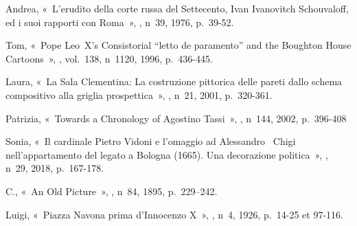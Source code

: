 \begin{teiElement}[name={TEI},change={commons\_edition}]
\begin{teiElement}[name={text},type={book},xmlid={book}]
\begin{teiElement}[name={group},type={book},xmlid={book-001}]
\begin{teiElement}[name={group},type={bibliography},data-page-title={Sources et bibliographie},data-include-href={Ch14\_Source\_bibliographie.xml},xmlid={bibliography-001}]
\begin{teiElement}[name={body}]
\begin{teiDiv}[type={section1},xmlid={div18}]
\begin{teiDiv}[type={section2},xmlid={div20}]
\begin{teiBibl}[xmlid={bibl-434}]
\end{teiBibl}
              \begin{teiBibl}[xmlid={bibl-435}]
 Andrea, « L’erudito della corte russa del Settecento, Ivan Ivanovitch Schouvaloff, ed i suoi rapporti con Roma », , n 39, 1976, p. 39-52.
\end{teiBibl}
              \begin{teiBibl}[xmlid={bibl-436}]
 Tom, « Pope Leo X’s Consistorial “letto de paramento” and the Boughton House Cartoons », , vol. 138, n 1120, 1996, p. 436-445.
\end{teiBibl}
              \begin{teiBibl}[xmlid={bibl-437}]
 Laura, « La Sala Clementina: La costruzione pittorica delle pareti dallo schema compositivo alla griglia prospettica », , n 21, 2001, p. 320-361.
\end{teiBibl}
              \begin{teiBibl}[xmlid={bibl-438}]
 Patrizia, « Towards a Chronology of Agostino Tassi », , n 144, 2002, p. 396-408
\end{teiBibl}
              \begin{teiBibl}[xmlid={bibl-439}]
 Sonia, « Il cardinale Pietro Vidoni e l’omaggio ad Alessandro  Chigi nell’appartamento del legato a Bologna (1665). Una decorazione politica », , n 29, 2018, p. 167-178.
\end{teiBibl}
              \begin{teiBibl}[xmlid={bibl-440}]
 C., « An Old Picture », , n 84, 1895, p. 229–242.
\end{teiBibl}
              \begin{teiBibl}[xmlid={bibl-441}]
 Luigi, « Piazza Navona prima d’Innocenzo X », , n 4, 1926, p. 14-25 et 97-116.
\end{teiBibl}
              \begin{teiBibl}[xmlid={bibl-442}]

\end{teiBibl}
\end{teiDiv}
\end{teiDiv}
\end{teiElement}
\end{teiElement}
\end{teiElement}
\end{teiElement}
\end{teiElement}
